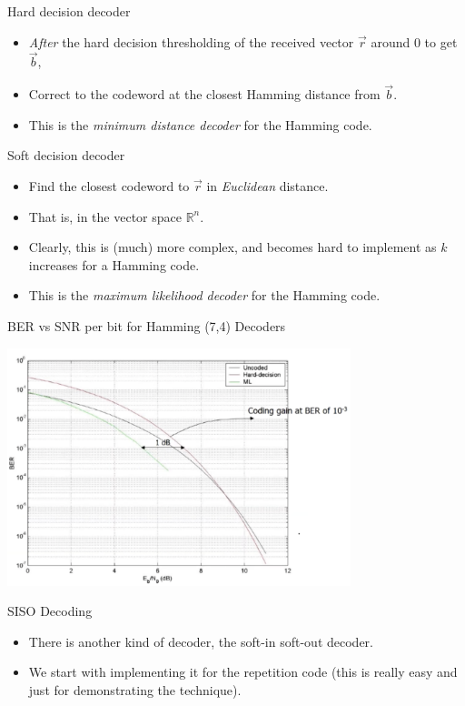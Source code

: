 \documentclass[aspectratio=1610, 10pt]{beamer}
\begin{document}
\begin{frame}[label={sec:org714a7df}]{Hard decision decoder}
\begin{itemize}
\item \emph{After} the hard decision thresholding of the received vector
\(\vec{r}\) around 0 to get \(\vec{b}\),
\item Correct to the codeword at the closest Hamming distance from
\(\vec{b}\).
\item This is the \emph{minimum distance decoder} for the Hamming code.
\end{itemize}
\end{frame}

\begin{frame}[label={sec:org0f63d65}]{Soft decision decoder}
\begin{itemize}
\item Find the closest codeword to \(\vec{r}\) in \emph{Euclidean} distance.
\item That is, in the vector space \(\mathbb{R}^n\).
\item Clearly, this is (much) more complex, and becomes hard to implement
as \(k\) increases for a Hamming code.
\item This is the \emph{maximum likelihood decoder} for the Hamming code.
\end{itemize}
\end{frame}

\begin{frame}[label={sec:orge80b702}]{BER vs SNR per bit for Hamming (7,4) Decoders}
\begin{center}
\includegraphics[width=0.75\textwidth]{./hamming_ber_snr.png}
\end{center}
\end{frame}

\begin{frame}[label={sec:orgef90246}]{SISO Decoding}
\begin{itemize}
\item There is another kind of decoder, the soft-in soft-out decoder.
\item We start with implementing it for the repetition code (this is
really easy and just for demonstrating the technique).
\end{itemize}
\end{frame}
\end{document}
